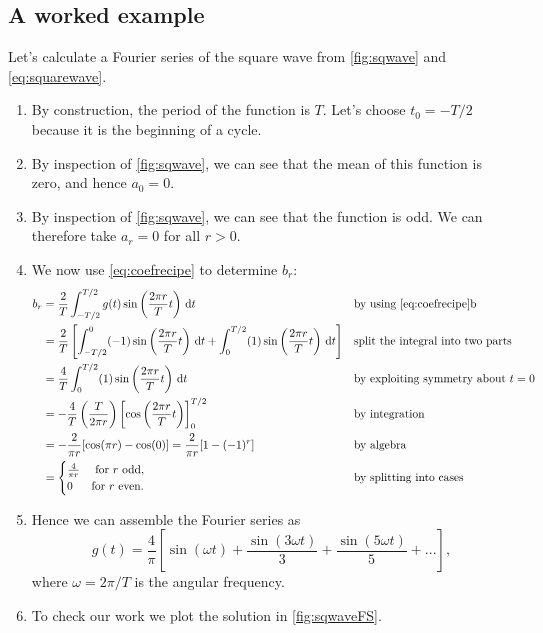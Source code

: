 \documentclass[11pt,twoside,a4paper]{article}
\begin{document}
\subsection{A worked example}

Let's calculate a Fourier series of the square wave from
\autoref{fig:sqwave} and \autoref{eq:squarewave}.
\begin{enumerate}
\item By construction, the period of the function is $T$.  Let's
  choose $t_0=-T/2$ because it is the beginning of a cycle.
\item By inspection of \autoref{fig:sqwave}, we can see that the mean
  of this function is zero, and hence $a_0=0$.
\item By inspection of \autoref{fig:sqwave}, we can see that the
  function is odd.  We can therefore take $a_r=0$ for all $r>0$.
\item We now use \autoref{eq:coefrecipe} to determine $b_r$:
  \begin{align}
    b_r &= \frac{2}{T}\int_{-T/2}^{T/2}g(t)\sin\left(\frac{2\pi
        r}{T}t\right)\,\infd t && \text{by using \autoref{eq:coefrecipe}b}\nonumber\\
    &= \frac{2}{T}\left[\int_{-T/2}^{0}(-1)\sin\left(\frac{2\pi
        r}{T}t\right)\,\infd t + \int_{0}^{T/2}(1)\sin\left(\frac{2\pi
        r}{T}t\right)\,\infd t\right] && \text{split the integral into
                                         two parts}\nonumber\\
    &= \frac{4}{T}\int_{0}^{T/2}(1)\sin\left(\frac{2\pi
        r}{T}t\right)\,\infd t&& \text{by exploiting symmetry about $t=0$}\nonumber\\
    &= -\frac{4}{T}\left(\frac{T}{2\pi r}\right)\left[\cos\left(\frac{2\pi
          r}{T}t\right)\right]_{0}^{T/2}&& \text{by integration}\nonumber\\
    &= -\frac{2}{\pi r}[\cos(\pi r) - \cos(0)] = \frac{2}{\pi r}[1 -
    (-1)^r] && \text{by algebra}\nonumber\\
    &=
    \begin{cases}
      \frac{4}{\pi r} & \text{ for $r$ odd},\\
      0 & \text{for $r$ even}.
    \end{cases}&& \text{by splitting into cases}\nonumber
  \end{align}
\item Hence we can assemble the Fourier series as 
  \begin{displaymath}
    g(t) = \frac{4}{\pi}\left[\sin(\omega t) + \frac{\sin(3\omega
        t)}{3} + \frac{\sin(5\omega t)}{5} + ...\right],
  \end{displaymath}
  where $\omega = 2\pi/T$ is the angular frequency.
\item To check our work we plot the solution in 
  \autoref{fig:sqwaveFS}.
\end{enumerate}
\end{document}

